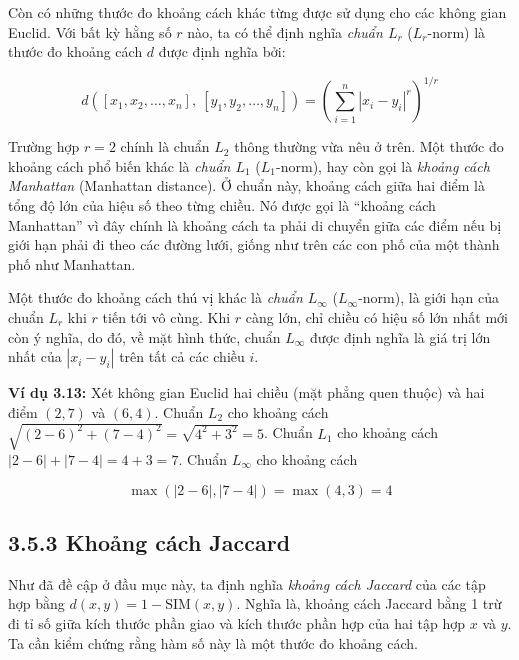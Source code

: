 Còn có những thước đo khoảng cách khác từng được sử dụng cho các không gian Euclid. Với bất kỳ hằng số $r$ nào, ta có thể định nghĩa \emph{chuẩn $L_r$} ($L_r$-norm) là thước đo khoảng cách $d$ được định nghĩa bởi:

$$d([x_1,x_2,\ldots,x_n],\ [y_1,y_2,\ldots,y_n]) = \left(\sum_{i=1}^{n}|x_i-y_i|^r\right)^{1/r}$$

Trường hợp $r=2$ chính là chuẩn $L_2$ thông thường vừa nêu ở trên. Một thước đo khoảng cách phổ biến khác là \emph{chuẩn $L_1$} ($L_1$-norm), hay còn gọi là \emph{khoảng cách Manhattan} (Manhattan distance). Ở chuẩn này, khoảng cách giữa hai điểm là tổng độ lớn của hiệu số theo từng chiều. Nó được gọi là ``khoảng cách Manhattan'' vì đây chính là khoảng cách ta phải di chuyển giữa các điểm nếu bị giới hạn phải đi theo các đường lưới, giống như trên các con phố của một thành phố như Manhattan.

Một thước đo khoảng cách thú vị khác là \emph{chuẩn $L_\infty$} ($L_\infty$-norm), là giới hạn của chuẩn $L_r$ khi $r$ tiến tới vô cùng. Khi $r$ càng lớn, chỉ chiều có hiệu số lớn nhất mới còn ý nghĩa, do đó, về mặt hình thức, chuẩn $L_\infty$ được định nghĩa là giá trị lớn nhất của $|x_i-y_i|$ trên tất cả các chiều $i$.

\textbf{Ví dụ 3.13:} Xét không gian Euclid hai chiều (mặt phẳng quen thuộc) và hai điểm $(2,7)$ và $(6,4)$. Chuẩn $L_2$ cho khoảng cách $\sqrt{(2-6)^2+(7-4)^2} = \sqrt{4^2+3^2} = 5$. Chuẩn $L_1$ cho khoảng cách $|2-6|+|7-4| = 4+3 = 7$. Chuẩn $L_\infty$ cho khoảng cách

$$\max(|2-6|,|7-4|) = \max(4,3) = 4$$

\subsection*{3.5.3 Khoảng cách Jaccard}

Như đã đề cập ở đầu mục này, ta định nghĩa \emph{khoảng cách Jaccard} của các tập hợp bằng $d(x,y) = 1 - \text{SIM}(x,y)$. Nghĩa là, khoảng cách Jaccard bằng 1 trừ đi tỉ số giữa kích thước phần giao và kích thước phần hợp của hai tập hợp $x$ và $y$. Ta cần kiểm chứng rằng hàm số này là một thước đo khoảng cách.

